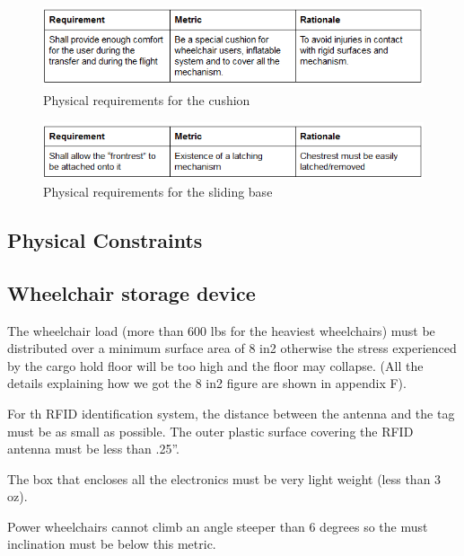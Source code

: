 \begin{figure}[h!]
  \centering
     \includegraphics[scale=1]{images/physical_requirements_cushion.png}
   \caption{Physical requirements for the cushion}
  \label{fig:phy_req_cushion}
\end{figure}

\begin{figure}[h!]
  \centering
     \includegraphics[scale=1]{images/physical_requirements_sliding_base.png}
   \caption{Physical requirements for the sliding base}
  \label{fig:phy_req_sliding_base}
\end{figure}

\newpage

\subsection{Physical Constraints}

\subsection*{Wheelchair storage device}

\begin{list}{-}{}
  \item The wheelchair load (more than 600 lbs for the heaviest wheelchairs) must be distributed over a minimum surface area of 8 in2 otherwise the stress experienced by the cargo hold floor will be too high and the floor may collapse. (All the details explaining how we got the 8 in2 figure are shown in appendix F).
  \item For th RFID identification system, the distance between the antenna and the tag must be as small as possible. The outer plastic surface covering the RFID antenna must be less than .25''.
  \item The box that encloses all the electronics must be very light weight (less than 3 oz).
  \item Power wheelchairs cannot climb an angle steeper than 6 degrees so the must inclination must be below this metric.
\end{list}

